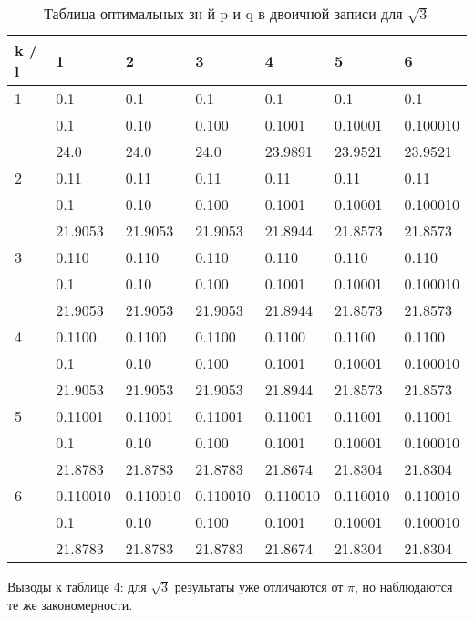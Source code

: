 \documentclass[12pt]{article}
\begin{document}
	\begin{table}[!h]
		\caption{Таблица оптимальных зн-й p и q в двоичной записи для $\sqrt{3}$}
		\label{sometable}
		\begin{center}
			\begin{tabular}{|l|l|l|l|l|l|l|}
				\hline
				k / l &1 & 2 & 3 & 4 & 5 & 6\\
				\hline
				1 & 0.1& 0.1& 0.1& 0.1& 0.1& 0.1\\
				& 0.1& 0.10& 0.100& 0.1001& 0.10001& 0.100010\\
				& 24.0& 24.0& 24.0& 23.9891& 23.9521& 23.9521\\
				\hline
				2 & 0.11& 0.11& 0.11& 0.11& 0.11& 0.11\\
				& 0.1& 0.10& 0.100& 0.1001& 0.10001& 0.100010\\
				& 21.9053& 21.9053& 21.9053& 21.8944& 21.8573& 21.8573\\
				\hline
				3 & 0.110& 0.110& 0.110& 0.110& 0.110& 0.110\\
				& 0.1& 0.10& 0.100& 0.1001& 0.10001& 0.100010\\
				& 21.9053& 21.9053& 21.9053& 21.8944& 21.8573& 21.8573\\
				\hline
				4 & 0.1100& 0.1100& 0.1100& 0.1100& 0.1100& 0.1100\\
				& 0.1& 0.10& 0.100& 0.1001& 0.10001& 0.100010\\
				& 21.9053& 21.9053& 21.9053& 21.8944& 21.8573& 21.8573\\
				\hline
				5 & 0.11001& 0.11001& 0.11001& 0.11001& 0.11001& 0.11001\\
				& 0.1& 0.10& 0.100& 0.1001& 0.10001& 0.100010\\
				& 21.8783& 21.8783& 21.8783& 21.8674& 21.8304& 21.8304\\
				\hline
				6 & 0.110010& 0.110010& 0.110010& 0.110010& 0.110010& 0.110010\\
				& 0.1& 0.10& 0.100& 0.1001& 0.10001& 0.100010\\
				& 21.8783& 21.8783& 21.8783& 21.8674& 21.8304& 21.8304\\
				\hline
			\end{tabular}
		\end{center}
	\end{table}
	
	Выводы к таблице 4: для $\sqrt{3}$ результаты уже отличаются от $\pi$, но наблюдаются те же закономерности.
	
\end{document}

